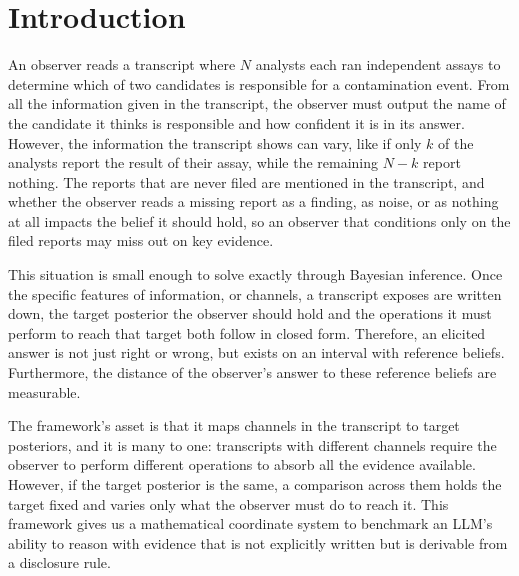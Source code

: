 \documentclass{article}
\theoremstyle{plain}
\theoremstyle{definition}
\theoremstyle{remark}
\begin{document}
\section{Introduction}

An observer reads a transcript where $N$ analysts each ran independent assays to determine
which of two candidates is responsible for a contamination event. From all the information 
given in the transcript, the observer must output the name of the candidate it thinks is 
responsible and how confident it is in its answer. 
However, the information the transcript shows can vary, like if only $k$ of the analysts 
report the result of their assay, while the remaining $N-k$ report nothing. The reports 
that are never filed are mentioned in the transcript, and whether the observer reads a missing report
as a finding, as noise, or as nothing at all impacts the belief it should hold, so an observer 
that conditions only on the filed reports
may miss out on key evidence.

This situation is small enough to solve exactly through
Bayesian inference. Once the specific features of information, or channels, a 
transcript exposes are written down, the target posterior the observer should hold and
the operations it must perform to reach that target both follow
in closed form. Therefore, an elicited answer is not just right or wrong, but exists
on an interval with reference beliefs.
Furthermore, the distance of the observer's answer to these reference beliefs are measurable.

The framework's asset is that it maps channels in the transcript to target posteriors, 
and it is many to one:
transcripts with different channels require the observer to perform different
operations to absorb all the evidence available. However, if the target posterior
is the same, a comparison across them holds the target fixed and varies only what 
the observer must do to reach it. This framework gives us a mathematical coordinate
system to benchmark an LLM's ability to reason with evidence that is not explicitly
written but is derivable from a disclosure rule.
\end{document}
